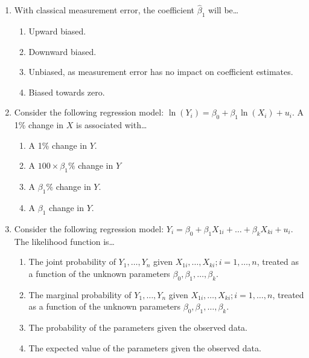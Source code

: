 \documentclass{article}
\begin{document}
\begin{enumerate}[label=\textbf{\arabic*.}]
    \item With classical measurement error, the coefficient $\hat{\beta}_1$ will be…
    \begin{enumerate}[label=\Alph*)]
        \item Upward biased.
        \item Downward biased.
        \item Unbiased, as measurement error has no impact on coefficient estimates.
        \item Biased towards zero. %
    \end{enumerate}

    \item Consider the following regression model: $\ln(Y_i) = \beta_0 + \beta_1 \ln(X_i) + u_i$. A 1\% change in $X$ is associated with…
    \begin{enumerate}[label=\Alph*)]
        \item A 1\% change in $Y$.
        \item A $100 \times \beta_1 \%$ change in $Y$
        \item A $\beta_1 \%$ change in $Y$. %
        \item A $\beta_1$ change in $Y$.
    \end{enumerate}

    \item Consider the following regression model: $Y_i = \beta_0 + \beta_1 X_{1i} + \ldots +  \beta_k X_{ki} + u_i$. The likelihood function is…
    \begin{enumerate}[label=\Alph*)]
        \item The joint probability of $Y_1, \ldots, Y_n$ given $X_{1i}, \ldots, X_{ki}; i=1, \ldots, n$, treated as a function of the unknown parameters $\beta_0, \beta_1, \ldots, \beta_k$. %
        \item The marginal probability of $Y_1, \ldots, Y_n$ given $X_{1i}, \ldots, X_{ki}; i=1, \ldots, n$, treated as a function of the unknown parameters $\beta_0, \beta_1, \ldots, \beta_k$.
        \item The probability of the parameters given the observed data.
        \item The expected value of the parameters given the observed data.
    \end{enumerate}


\end{enumerate}
\end{document}
